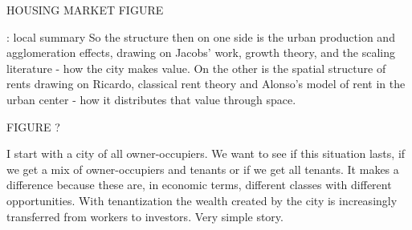 \documentclass[]{article}
\begin{document}
\hspace{4cm} HOUSING MARKET FIGURE %
           



{\color{orange}: local summary So the structure then on one side is the urban production and agglomeration effects, drawing on Jacobs’ work, growth theory, and the scaling literature - how the city makes value. On the other is the spatial structure of rents drawing on Ricardo, classical rent theory and Alonso’s model of rent in the urban center - how it distributes that value through space.}






\hspace{4cm}FIGURE ?




I start with a city of all owner-occupiers. We want to see if this situation lasts, if we get a mix of owner-occupiers and tenants or if we get all tenants. It makes a difference because these are, in economic terms, different classes with different opportunities. With tenantization  
the wealth created by the city is increasingly transferred from workers to investors. Very simple story. 

\end{document}
